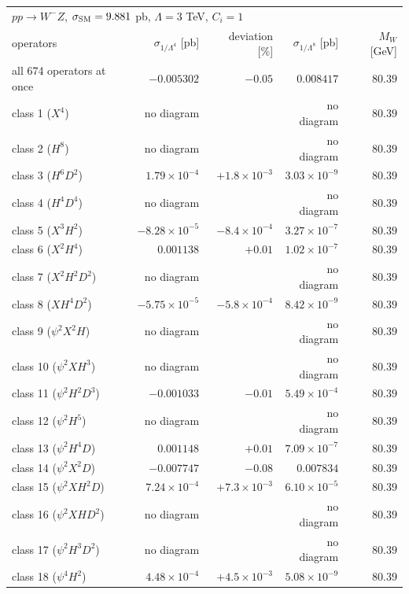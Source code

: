\begin{table}[t]\centering\footnotesize\setlength{\tabcolsep}{4pt}
\begin{tabular}{@{}lrrrr@{}}\hline
\multicolumn{5}{l}{$p p \to W^- Z$, $\sigma_{\rm SM} = 9.881$ pb, $\Lambda = 3$ TeV, $C_i = 1$}\\
operators & $\sigma_{1/\Lambda^4}$ [pb] & deviation [\%] & $\sigma_{1/\Lambda^8}$ [pb] & $M_W$ [GeV]\\\hline
all 674 operators at once & $-0.005302$ & $-0.05$ & $0.008417$ & $80.39$\\
class 1 ($X^4$) & no diagram &  & no diagram & $80.39$\\
class 2 ($H^8$) & no diagram &  & no diagram & $80.39$\\
class 3 ($H^6 D^2$) & $1.79\times 10^{-4}$ & $+1.8\times 10^{-3}$ & $3.03\times 10^{-9}$ & $80.39$\\
class 4 ($H^4 D^4$) & no diagram &  & no diagram & $80.39$\\
class 5 ($X^3 H^2$) & $-8.28\times 10^{-5}$ & $-8.4\times 10^{-4}$ & $3.27\times 10^{-7}$ & $80.39$\\
class 6 ($X^2 H^4$) & $0.001138$ & $+0.01$ & $1.02\times 10^{-7}$ & $80.39$\\
class 7 ($X^2 H^2 D^2$) & no diagram &  & no diagram & $80.39$\\
class 8 ($X H^4 D^2$) & $-5.75\times 10^{-5}$ & $-5.8\times 10^{-4}$ & $8.42\times 10^{-9}$ & $80.39$\\
class 9 ($\psi^2 X^2 H$) & no diagram &  & no diagram & $80.39$\\
class 10 ($\psi^2 X H^3$) & no diagram &  & no diagram & $80.39$\\
class 11 ($\psi^2 H^2 D^3$) & $-0.001033$ & $-0.01$ & $5.49\times 10^{-4}$ & $80.39$\\
class 12 ($\psi^2 H^5$) & no diagram &  & no diagram & $80.39$\\
class 13 ($\psi^2 H^4 D$) & $0.001148$ & $+0.01$ & $7.09\times 10^{-7}$ & $80.39$\\
class 14 ($\psi^2 X^2 D$) & $-0.007747$ & $-0.08$ & $0.007834$ & $80.39$\\
class 15 ($\psi^2 X H^2 D$) & $7.24\times 10^{-4}$ & $+7.3\times 10^{-3}$ & $6.10\times 10^{-5}$ & $80.39$\\
class 16 ($\psi^2 X H D^2$) & no diagram &  & no diagram & $80.39$\\
class 17 ($\psi^2 H^3 D^2$) & no diagram &  & no diagram & $80.39$\\
class 18 ($\psi^4 H^2$) & $4.48\times 10^{-4}$ & $+4.5\times 10^{-3}$ & $5.08\times 10^{-9}$ & $80.39$\\

\end{tabular}
\end{table}
